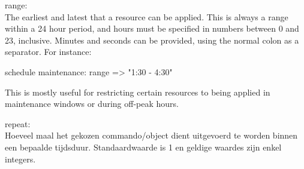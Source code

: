 range:\\
The earliest and latest that a resource can be applied. This is always a range within a 24 hour period, and hours must be specified in numbers between 0 and 23, inclusive. Minutes and seconds can be provided, using the normal colon as a separator. For instance:

schedule { maintenance:
  range => "1:30 - 4:30"
}

This is mostly useful for restricting certain resources to being applied in maintenance windows or during off-peak hours.

repeat:\\
Hoeveel maal het gekozen commando/object dient uitgevoerd te worden binnen een bepaalde tijdsduur. Standaardwaarde is 1 en geldige waardes zijn enkel integers.\\\\
